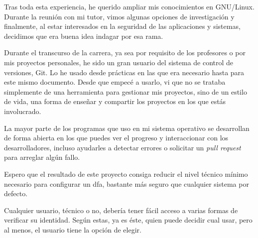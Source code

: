 \documentclass[twoside, titlepage, 12pt, a4paper]{article}
\begin{document}
Tras toda esta experiencia, he querido ampliar mis conocimientos en \gls{GNU/Linux}. Durante la reunión con mi tutor, vimos algunas opciones de investigación y finalmente, al estar interesados en la seguridad de las aplicaciones y sistemas, decidimos que era buena idea indagar por esa rama.\par
Durante el transcurso de la carrera, ya sea por requisito de los profesores o por mis proyectos personales, he sido un gran usuario del sistema de control de versiones, \gls{Git}. Lo he usado desde prácticas en las que era necesario hasta para este mismo documento. Desde que empecé a usarlo, vi que no se trataba simplemente de una herramienta para gestionar mis proyectos, sino de un estilo de vida, una forma de enseñar y compartir los proyectos en los que estás involucrado.\par
La mayor parte de los programas que uso en mi sistema operativo se desarrollan de forma abierta en los que puedes ver el progreso y interaccionar con los desarrolladores, incluso ayudarles a detectar errores o solicitar un \textit{pull request} para arreglar algún fallo.\par
Espero que el resultado de este proyecto consiga reducir el nivel técnico mínimo necesario para configurar un \gls{dfa}, bastante más seguro que cualquier sistema por defecto.\par
Cualquier usuario, técnico o no, debería tener fácil acceso a varias formas de verificar su identidad. Según estas, ya es éste, quien puede decidir cual usar, pero al menos, el usuario tiene la opción de elegir.
\end{document}
